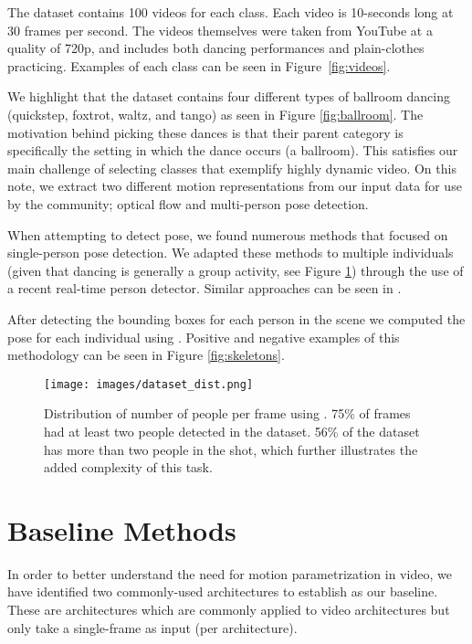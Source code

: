 \documentclass[10pt,twocolumn,letterpaper]{article}
\begin{document}
The dataset contains 100 videos for each class. Each video is 10-seconds long at 30 frames per second. The videos themselves were taken from YouTube at a quality of 720p, and includes both dancing performances and plain-clothes practicing.  Examples of each class can be seen in Figure~\ref{fig:videos}.

We highlight that the dataset contains four different types of ballroom dancing (quickstep, foxtrot, waltz, and tango) as seen in Figure \ref{fig:ballroom}. The motivation behind picking these dances is that their parent category is specifically the setting in which the dance occurs (a ballroom). This satisfies our main challenge of selecting classes that exemplify highly dynamic video. On this note, we extract two different motion representations from our input data for use by the community; optical flow\cite{farneback2003two} and multi-person pose detection.

When attempting to detect pose, we found numerous methods that focused on single-person pose detection. We adapted these methods to multiple individuals (given that dancing is generally a group activity, see Figure \ref{fig:skeldist}) through the use of a recent real-time person detector\cite{redmon2015you}. Similar approaches can be seen in  \cite{gkioxari2014using}\cite{pishchulin2012articulated}\cite{cao2016realtime}.

After detecting the bounding boxes for each person in the scene we computed the pose for each individual using \cite{wei2016convolutional}. Positive and negative examples of this methodology can be seen in Figure \ref{fig:skeletons}.


\begin{figure}[t]
\centering
\texttt{[image: images/dataset\_dist.png]}
\caption{Distribution of number of people per frame using \cite{redmon2015you}. 75\% of frames had at least two people detected in the dataset. 56\% of the dataset has more than two people in the shot, which further illustrates the added complexity of this task.}
\label{fig:skeldist}
\end{figure}

\section{\label{sec:baselinemethods}Baseline Methods}
In order to better understand the need for motion parametrization in video, we have identified two commonly-used architectures to establish as our baseline. These are architectures which are commonly applied to video architectures but only take a single-frame as input (per architecture). 
\end{document}
